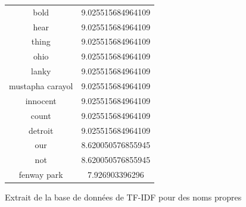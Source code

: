\documentclass[a4paper, 12pt]{article}
\begin{document}
\begin{figure}[!h]
\begin{center}
\begin{tabular}{|c|c|}
  bold  & 9.025515684964109 \\
  hear  & 9.025515684964109 \\
  thing  & 9.025515684964109 \\
  ohio  & 9.025515684964109 \\
  lanky  & 9.025515684964109 \\
  mustapha carayol  & 9.025515684964109 \\
  innocent  & 9.025515684964109 \\
  count  & 9.025515684964109 \\
  detroit  & 9.025515684964109 \\
  our  & 8.620050576855945 \\
  not  & 8.620050576855945 \\
  fenway park  & 7.926903396296 \\
  \hline
 \end{tabular}
\label{fig:TFIDFNoms}
\caption{Extrait de la base de données de TF-IDF pour des noms propres}
\end{center}
\end{figure}

\newpage
\printindex
\end{document}
